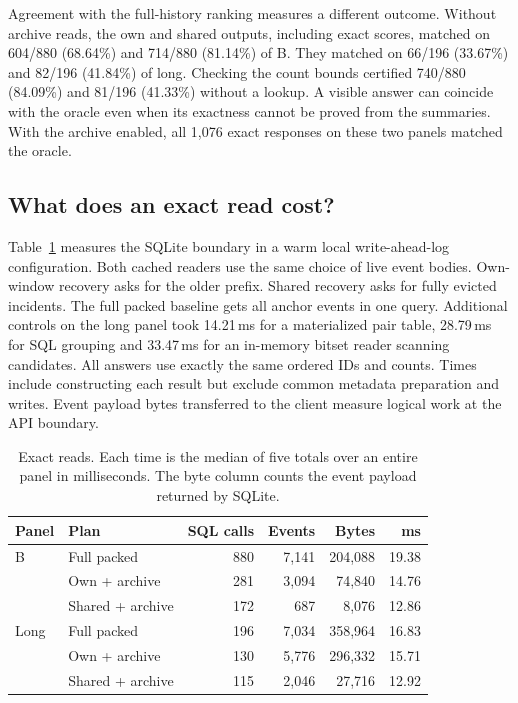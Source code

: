 \documentclass[conference]{IEEEtran}
\begin{document}
Agreement with the full-history ranking measures a different outcome. Without archive reads, the own and shared outputs, including exact scores, matched on 604/880 (68.64\%) and 714/880 (81.14\%) of B. They matched on 66/196 (33.67\%) and 82/196 (41.84\%) of long. Checking the count bounds certified 740/880 (84.09\%) and 81/196 (41.33\%) without a lookup. A visible answer can coincide with the oracle even when its exactness cannot be proved from the summaries. With the archive enabled, all 1,076 exact responses on these two panels matched the oracle.

\subsection{What does an exact read cost?}
Table~\ref{tab:reads} measures the SQLite boundary in a warm local write-ahead-log configuration. Both cached readers use the same choice of live event bodies. Own-window recovery asks for the older prefix. Shared recovery asks for fully evicted incidents. The full packed baseline gets all anchor events in one query. Additional controls on the long panel took 14.21\,ms for a materialized pair table, 28.79\,ms for SQL grouping and 33.47\,ms for an in-memory bitset reader scanning candidates. All answers use exactly the same ordered IDs and counts. Times include constructing each result but exclude common metadata preparation and writes. Event payload bytes transferred to the client measure logical work at the API boundary.

\begin{table}[t]
\caption{Exact reads. Each time is the median of five totals over an entire panel in milliseconds. The byte column counts the event payload returned by SQLite.}
\label{tab:reads}\centering\small
\setlength{\tabcolsep}{4pt}\begin{tabular}{@{}llrrrr@{}}\toprule
Panel & Plan & SQL calls & Events & Bytes & ms\\\midrule
B & Full packed & 880 & 7,141 & 204,088 & 19.38\\
& Own + archive & 281 & 3,094 & 74,840 & 14.76\\
& Shared + archive & 172 & 687 & 8,076 & 12.86\\\midrule
Long & Full packed & 196 & 7,034 & 358,964 & 16.83\\
& Own + archive & 130 & 5,776 & 296,332 & 15.71\\
& Shared + archive & 115 & 2,046 & 27,716 & 12.92\\\bottomrule
\end{tabular}
\end{table}
\end{document}
